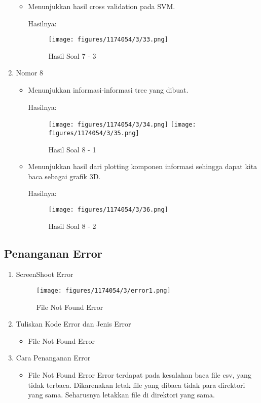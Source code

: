 \begin{enumerate}
\begin{itemize}
\item Menunjukkan hasil cross validation pada SVM.

Hasilnya:
\begin{figure}[H]
	\centering
		\texttt{[image: figures/1174054/3/33.png]}
		\caption{Hasil Soal 7 - 3}
\end{figure}
\end{itemize}

\item Nomor 8
\begin{itemize}
\item Menunjukkan informasi-informasi tree yang dibuat.

Hasilnya:
\begin{figure}[H]
	\centering
		\texttt{[image: figures/1174054/3/34.png]}
		\texttt{[image: figures/1174054/3/35.png]}
		\caption{Hasil Soal 8 - 1}
\end{figure}
		
\item Menunjukkan hasil dari plotting komponen informasi sehingga dapat kita baca sebagai grafik 3D.

Hasilnya:
\begin{figure}[H]
	\centering
		\texttt{[image: figures/1174054/3/36.png]}
		\caption{Hasil Soal 8 - 2}
\end{figure}
\end{itemize}
\end{enumerate}

\subsection{Penanganan Error}
\begin{enumerate}
\item ScreenShoot Error
	\begin{figure}[H]
		\texttt{[image: figures/1174054/3/error1.png]}
		\centering
		\caption{File Not Found Error}
	\end{figure}

	\item Tuliskan Kode Error dan Jenis Error
	\begin{itemize}
		\item File Not Found Error

	\end{itemize}
	\item Cara Penanganan Error
	\begin{itemize}
		\item File Not Found Error
		\hfill\break
		Error terdapat pada kesalahan baca file csv, yang tidak terbaca. Dikarenakan letak file yang dibaca tidak para direktori yang sama. Seharusnya letakkan file di direktori yang sama. 
	\end{itemize}
\end{enumerate}

